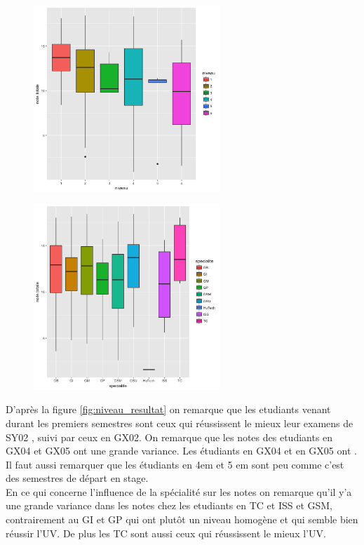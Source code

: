 \documentclass[]{report}
\begin{document}
\begin{figure}[h!]
	\begin{minipage}{.5\textwidth}
		\centering
		\includegraphics[width=70mm]{Figures/Notes/niveau_resultat.png}
		\label{fig:niveau_resultat}
	\end{minipage}%
	\hspace{0.08\linewidth}
	\begin{minipage}{.5\textwidth}
		\centering
		\includegraphics[width=70mm]{Figures/Notes/specialite_resultat.png}
		\label{fig:specialite_resultat}
	\end{minipage}
\end{figure}
D'après la figure \ref{fig:niveau_resultat} on remarque que les etudiants venant durant les premiers semestres sont ceux qui réussissent le mieux leur examens de SY02 , suivi par ceux en GX02. On remarque que les notes des etudiants en GX04 et GX05 ont une grande variance. Les étudiants en GX04 et en GX05 ont . Il faut aussi remarquer que les étudiants en 4em et 5 em sont peu comme c'est des semestres de départ en stage. \\
En ce qui concerne l'influence de la spécialité sur les notes on remarque qu'il y'a une grande variance dans les  notes chez les etudiants en  TC et ISS et GSM, contrairement au GI et GP qui ont plutôt un niveau homogène et qui semble bien réussir l'UV. De plus les TC sont aussi ceux qui réussissent le mieux l'UV.
\end{document}
